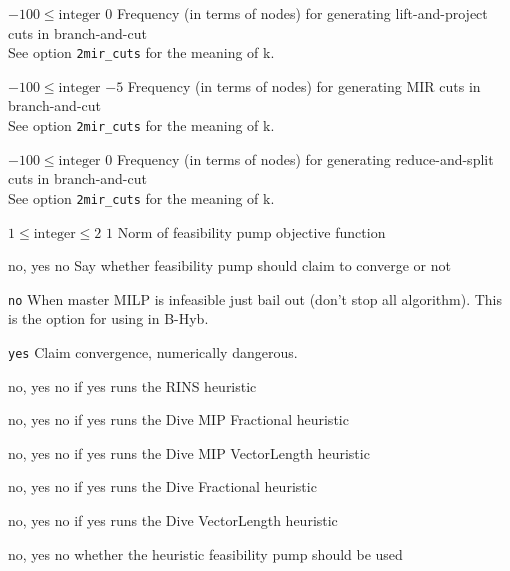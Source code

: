 %
{$-100\leq\textrm{integer}$}%
{$0$}%
{Frequency (in terms of nodes) for generating lift-and-project cuts in branch-and-cut\\
See option \texttt{2mir\_cuts} for the meaning of k.}%
{}

%
{$-100\leq\textrm{integer}$}%
{$-5$}%
{Frequency (in terms of nodes) for generating MIR cuts in branch-and-cut\\
See option \texttt{2mir\_cuts} for the meaning of k.}%
{}

%
{$-100\leq\textrm{integer}$}%
{$0$}%
{Frequency (in terms of nodes) for generating reduce-and-split cuts in branch-and-cut\\
See option \texttt{2mir\_cuts} for the meaning of k.}%
{}

%
{$1\leq\textrm{integer}\leq2$}%
{$1$}%
{Norm of feasibility pump objective function}%
{}

%
{\ttfamily no, yes}%
{no}%
{Say whether feasibility pump should claim to converge or not}%
{\begin{list}{}{
\setlength{\parsep}{0em}
\setlength{\leftmargin}{5ex}
\setlength{\labelwidth}{2ex}
\setlength{\itemindent}{0ex}
\setlength{\topsep}{0pt}}
\item[\texttt{no}] When master MILP is infeasible just bail out (don't stop all algorithm). This is the option for using in B-Hyb.
\item[\texttt{yes}] Claim convergence, numerically dangerous.
\end{list}
}

%
{\ttfamily no, yes}%
{no}%
{if yes runs the RINS heuristic}%
{
}

%
{\ttfamily no, yes}%
{no}%
{if yes runs the Dive MIP Fractional heuristic}%
{
}

%
{\ttfamily no, yes}%
{no}%
{if yes runs the Dive MIP VectorLength heuristic}%
{
}

%
{\ttfamily no, yes}%
{no}%
{if yes runs the Dive Fractional heuristic}%
{
}

%
{\ttfamily no, yes}%
{no}%
{if yes runs the Dive VectorLength heuristic}%
{
}

%
{\ttfamily no, yes}%
{no}%
{whether the heuristic feasibility pump should be used}%
{
}

